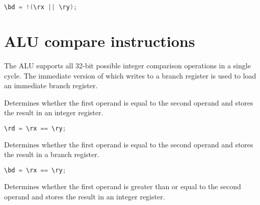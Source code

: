 \begin{lstlisting}[numbers=none, basicstyle=\ttfamily\footnotesize, language=C++]
\bd = !(\rx || \ry);
\end{lstlisting}

\section{ALU compare instructions}


The \rvex{} ALU supports all 32-bit possible integer comparison operations in a
single cycle. The immediate version of  which writes to a branch
register is used to load an immediate branch register.

Determines whether the first operand is equal to the second operand and stores
the result in an integer register.

\begin{lstlisting}[numbers=none, basicstyle=\ttfamily\footnotesize, language=C++]
\rd = \rx == \ry;
\end{lstlisting}

Determines whether the first operand is equal to the second operand and stores
the result in a branch register.

\begin{lstlisting}[numbers=none, basicstyle=\ttfamily\footnotesize, language=C++]
\bd = \rx == \ry;
\end{lstlisting}

Determines whether the first operand is greater than or equal to the second
operand and stores the result in an integer register.

